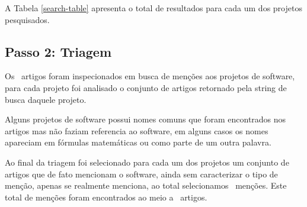 A Tabela \ref{search-table} apresenta o total de resultados para cada um dos projetos pesquisados.




\subsection{Passo 2: Triagem}

Os \SearchUniqueCount \ artigos foram inspecionados em busca de menções aos
projetos de software, para cada projeto foi analisado o conjunto de artigos
retornado pela string de busca daquele projeto.


Alguns projetos de
software possui nomes comuns que foram encontrados nos artigos mas não faziam
referencia ao software, em alguns casos os nomes apareciam em fórmulas
matemáticas ou como parte de um outra palavra.

Ao final da triagem foi selecionado para cada um dos projetos um conjunto de artigos
que de fato mencionam o software, ainda sem caracterizar o tipo de menção,
apenas se realmente menciona, ao total selecionamos \ScreeningCount \ menções.
Este total de menções foram encontrados ao meio a \ScreeningUniqueCount \
artigos.




